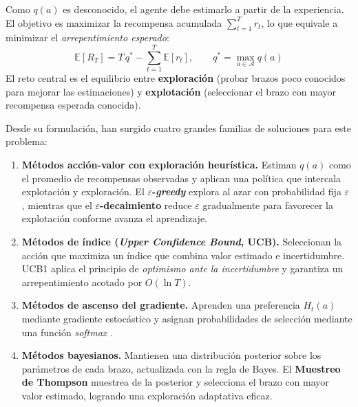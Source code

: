 Como $q(a)$ es desconocido, el agente debe estimarlo a partir de la experiencia. El objetivo es maximizar la recompensa acumulada $\sum_{t=1}^{T} r_t$, lo que equivale a minimizar el \textit{arrepentimiento esperado}:
\begin{equation}
    \mathbb{E}[R_T] = T\,q^* - \sum_{t=1}^{T} \mathbb{E}[r_t], \qquad q^* = \max_{a \in \mathcal{A}} q(a)
\end{equation}
El reto central es el equilibrio entre \textbf{exploración} (probar brazos poco conocidos para mejorar las estimaciones) y \textbf{explotación} (seleccionar el brazo con mayor recompensa esperada conocida).

Desde su formulación, han surgido cuatro grandes familias de soluciones para este problema:

\begin{enumerate}

    \item \textbf{Métodos acción-valor con exploración heurística.} Estiman $q(a)$ como el promedio de recompensas observadas y aplican una política que intercala explotación y exploración. El \textbf{$\varepsilon$-\textit{greedy}} explora al azar con probabilidad fija $\varepsilon$ \cite{sutton2018}, mientras que el \textbf{$\varepsilon$-decaimiento} reduce $\varepsilon$ gradualmente para favorecer la explotación conforme avanza el aprendizaje.

    \item \textbf{Métodos de índice (\textit{Upper Confidence Bound}, UCB).} Seleccionan la acción que maximiza un índice que combina valor estimado e incertidumbre. UCB1 \cite{auer2002} aplica el principio de \textit{optimismo ante la incertidumbre} y garantiza un arrepentimiento acotado por $O(\ln T)$.

    \item \textbf{Métodos de ascenso del gradiente.} Aprenden una preferencia $H_t(a)$ mediante gradiente estocástico y asignan probabilidades de selección mediante una función \textit{softmax} \cite{sutton2018}.

    \item \textbf{Métodos bayesianos.} Mantienen una distribución posterior sobre los parámetros de cada brazo, actualizada con la regla de Bayes. El \textbf{Muestreo de Thompson} \cite{thompson1933, russo2018} muestrea de la posterior y selecciona el brazo con mayor valor estimado, logrando una exploración adaptativa eficaz.

\end{enumerate}

